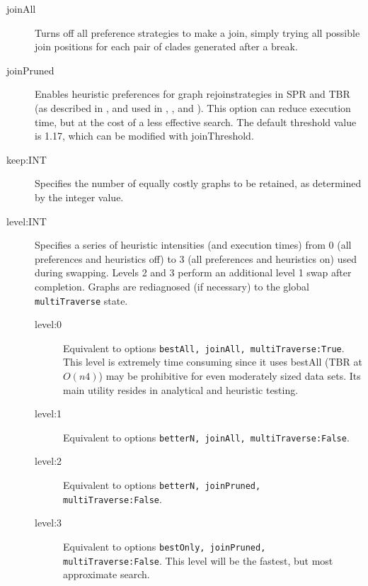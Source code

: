 \begin{description}
		\item[joinAll] Turns off all preference strategies to make a join, simply trying all possible 
		join positions for each pair of clades generated after a break. 

		\item[joinPruned] Enables heuristic preferences for graph rejoinstrategies in SPR 
		and TBR (as described in \citep{VaronandWheeler2013}, and used in 
		\citep{Wheeler1991-1998}, \cite{Goloboffetal2008}, and \cite{Varonetal2010, Wheeleretal2015}). 
		This option can reduce execution time, but at the cost of a less eﬀective search. 
		The default threshold value is 1.17, which can be modified with joinThreshold.
		
				
		\item[keep:INT] Specifies the number of equally costly graphs to be retained, as
		determined by the integer value.		
		
		\item[level:INT] Specifies a series of heuristic intensities (and execution times) from 0 (all 
		preferences and heuristics off) to 3 (all preferences and heuristics on) used during swapping. 
		Levels 2 and 3 perform an additional level 1 swap after completion. Graphs are rediagnosed 
		(if necessary) to the global \texttt{multiTraverse} state.
		
		\begin{description}
			
			\item[level:0] Equivalent to options \texttt{bestAll, joinAll, multiTraverse:True}. This 
			level is extremely time consuming  since it uses bestAll (TBR at $O(n4)$) may be 
			prohibitive for even moderately 	sized data sets. Its main utility resides in analytical and
			heuristic testing.
			
			\item[level:1] Equivalent to options \texttt{betterN, joinAll, multiTraverse:False}.
			
			\item[level:2] Equivalent to options \texttt{betterN, joinPruned, multiTraverse:False}. 
			
			\item[level:3] Equivalent to options \texttt{bestOnly, joinPruned, multiTraverse:False}. 
			This level will be the fastest, but most approximate search.
			

\end{description}
\end{description}
